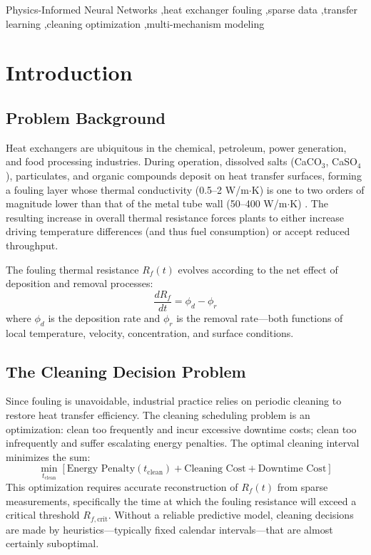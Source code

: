 \documentclass[review]{elsarticle}
\begin{document}
\begin{frontmatter}
\begin{keyword}
Physics-Informed Neural Networks \sep heat exchanger fouling \sep sparse data \sep transfer learning \sep cleaning optimization \sep multi-mechanism modeling
\end{keyword}

\end{frontmatter}

\linenumbers

\section{Introduction}

\subsection{Problem Background}

Heat exchangers are ubiquitous in the chemical, petroleum, power generation, and food processing industries. During operation, dissolved salts (CaCO$_3$, CaSO$_4$), particulates, and organic compounds deposit on heat transfer surfaces, forming a fouling layer whose thermal conductivity (0.5--2 W/m$\cdot$K) is one to two orders of magnitude lower than that of the metal tube wall (50--400 W/m$\cdot$K) \cite{muller2005fouling}. The resulting increase in overall thermal resistance forces plants to either increase driving temperature differences (and thus fuel consumption) or accept reduced throughput.

The fouling thermal resistance $R_f(t)$ evolves according to the net effect of deposition and removal processes:
\begin{equation}
\frac{dR_f}{dt} = \phi_d - \phi_r
\end{equation}
where $\phi_d$ is the deposition rate and $\phi_r$ is the removal rate---both functions of local temperature, velocity, concentration, and surface conditions.

\subsection{The Cleaning Decision Problem}

Since fouling is unavoidable, industrial practice relies on periodic cleaning to restore heat transfer efficiency. The cleaning scheduling problem is an optimization: clean too frequently and incur excessive downtime costs; clean too infrequently and suffer escalating energy penalties. The optimal cleaning interval minimizes the sum:
\begin{equation}
\min_{t_{\text{clean}}} \left[ \text{Energy Penalty}(t_{\text{clean}}) + \text{Cleaning Cost} + \text{Downtime Cost} \right]
\end{equation}
This optimization requires accurate reconstruction of $R_f(t)$ from sparse measurements, specifically the time at which the fouling resistance will exceed a critical threshold $R_{f,\text{crit}}$. Without a reliable predictive model, cleaning decisions are made by heuristics---typically fixed calendar intervals---that are almost certainly suboptimal.
\end{document}
